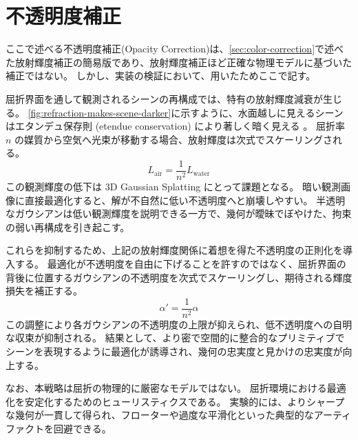 \newpage
\section{不透明度補正}\label{sec:opacity-correction}

ここで述べる不透明度補正(Opacity Correction)は、\cref{sec:color-correction}で述べた放射輝度補正の簡易版であり、放射輝度補正ほど正確な物理モデルに基づいた補正ではない。
しかし、実装の検証において、用いたためここで記す。

屈折界面を通して観測されるシーンの再構成では、特有の放射輝度減衰が生じる。
\cref{fig:refraction-makes-scene-darker}に示すように、水面越しに見えるシーンはエタンデュ保存則 (etendue conservation) により著しく暗く見える \cite{etendue}。
屈折率 $n$ の媒質から空気へ光束が移動する場合、放射輝度は次式でスケーリングされる。
\begin{equation}
L_{\mathrm{air}} = \frac{1}{n^{2}} L_{\mathrm{water}}
\end{equation}
この観測輝度の低下は 3D Gaussian Splatting にとって課題となる。
暗い観測画像に直接最適化すると、解が不自然に低い不透明度へと崩壊しやすい。
半透明なガウシアンは低い観測輝度を説明できる一方で、幾何が曖昧でぼやけた、拘束の弱い再構成を引き起こす。

これらを抑制するため、上記の放射輝度関係に着想を得た不透明度の正則化を導入する。
最適化が不透明度を自由に下げることを許すのではなく、屈折界面の背後に位置するガウシアンの不透明度を次式でスケーリングし、期待される輝度損失を補正する。
\begin{equation}
\alpha' = \frac{1}{n^{2}} \alpha
\end{equation}
この調整により各ガウシアンの不透明度の上限が抑えられ、低不透明度への自明な収束が抑制される。
結果として、より密で空間的に整合的なプリミティブでシーンを表現するように最適化が誘導され、幾何の忠実度と見かけの忠実度が向上する。

なお、本戦略は屈折の物理的に厳密なモデルではない。
屈折環境における最適化を安定化するためのヒューリスティクスである。
実験的には、よりシャープな幾何が一貫して得られ、フローターや過度な平滑化といった典型的なアーティファクトを回避できる。
